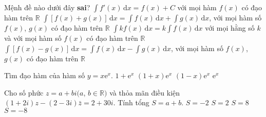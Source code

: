 \begin{ex}%
	Mệnh đề nào dưới đây \textbf{sai}?
	\choice
	{$\displaystyle \int f'(x)\mathrm{\,d}x=f(x)+C$ với mọi hàm $f(x)$ có đạo hàm trên $\mathbb{R}$}
	{$\displaystyle \int [f(x)+g(x)]\mathrm{\,d}x=\displaystyle \int f(x)\mathrm{\,d}x+\displaystyle \int g(x)\mathrm{\,d}x$, với mọi hàm số $f(x)$, $g(x)$ có đạo hàm trên $\mathbb{R}$}
	{\True $\displaystyle \int kf(x)\mathrm{\,d}x=k\displaystyle \int f(x)\mathrm{\,d}x $ với mọi hằng số $k$ và với mọi hàm số $f(x)$ có đạo hàm trên $\mathbb{R}$}
	{$\displaystyle \int [f(x)-g(x)]\mathrm{\,d}x=\displaystyle \int f(x)\mathrm{\,d}x-\displaystyle \int g(x)\mathrm{\,d}x $, với mọi hàm số $f(x)$, $g(x)$ có đạo hàm trên $\mathbb{R}$}
\end{ex}
\begin{ex}%
	Tìm đạo hàm của hàm số $y=x\mathrm{e}^x$.
	\choice
	{$1+\mathrm{e}^x $}
	{\True $(1+x)\mathrm{e}^x $}
	{$(1-x)\mathrm{e}^x $}
	{$\mathrm{e}^x $}
\end{ex}
\begin{ex}%
	Cho số phức $z=a+bi(a$, $b\in\mathbb{R})$ và thỏa mãn điều kiện $(1+2i)z-(2-3i)\bar{z}=2+30i$. Tính tổng $S=a+b$.
	\choice
	{$S=-2 $}
	{$S=2 $}
	{\True $S=8 $}
	{$S=-8 $}
\end{ex}
